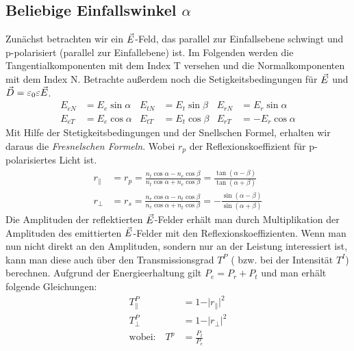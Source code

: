  \subsection{Beliebige Einfallswinkel $\alpha$}
 Zunächst betrachten wir ein $\vec{E}$-Feld, das parallel zur Einfallsebene schwingt und p-polarisiert (parallel zur Einfallebene) ist. Im Folgenden werden die Tangentialkomponenten mit dem Index T versehen und die Normalkomponenten mit dem Index N. Betrachte außerdem noch die Setigkeitsbedingungen für $\vec{E}$ und $\vec{D}=\varepsilon_0\varepsilon\vec{E}$.
 \begin{align*}
 	E_{eN}&=E_e\sin\alpha&E_{tN}&=E_t\sin\beta&E_{rN}&=E_r\sin\alpha\\
 	E_{eT}&=E_e\cos\alpha&E_{tT}&=E_t\cos\beta&E_{rT}&=-E_r\cos\alpha
 \end{align*}
 Mit Hilfe der Stetigkeitsbedingungen und der Snellschen Formel, erhalten wir daraus die \emph{Fresnelschen Formeln}. Wobei $r_p$ der Reflexionskoeffizient für p-polarisiertes Licht ist.
 \begin{align}
 	r_{\parallel}&=r_p=\frac{n_t\cos\alpha -n_e\cos\beta}{n_t\cos\alpha +n_e\cos\beta}=\frac{\tan(\alpha -\beta)}{\tan(\alpha +\beta)}\label{FF1}\\
 	r_{\bot}&=r_s=\frac{n_e\cos\alpha -n_t\cos\beta}{n_e\cos\alpha +n_t\cos\beta}=-\frac{\sin(\alpha -\beta)}{\sin(\alpha +\beta)}\label{FF2}
 \end{align}
 Die Amplituden der reflektierten $\vec{E}$-Felder erhält man durch Multiplikation der Amplituden des emittierten $\vec{E}$-Felder mit den Reflexionskoeffizienten.
 Wenn man nun nicht direkt an den Amplituden, sondern nur an der Leistung interessiert ist, kann man diese auch über den Transmissionsgrad $T^P$ ( bzw. bei der Intensität $T^{I}$) berechnen. Aufgrund der Energieerhaltung gilt $ P_e=P_r+P_t$ und man erhält folgende Gleichungen:
 \begin{align*}
 	T_{\parallel}^P&= 1-\vert r_{\parallel}\vert^2\\
 	T_{\bot}^P&= 1-\vert r_{\bot}\vert^2\\
 	\text{wobei:}\quad T^p&=\frac{P_t}{P_e}
 \end{align*}
